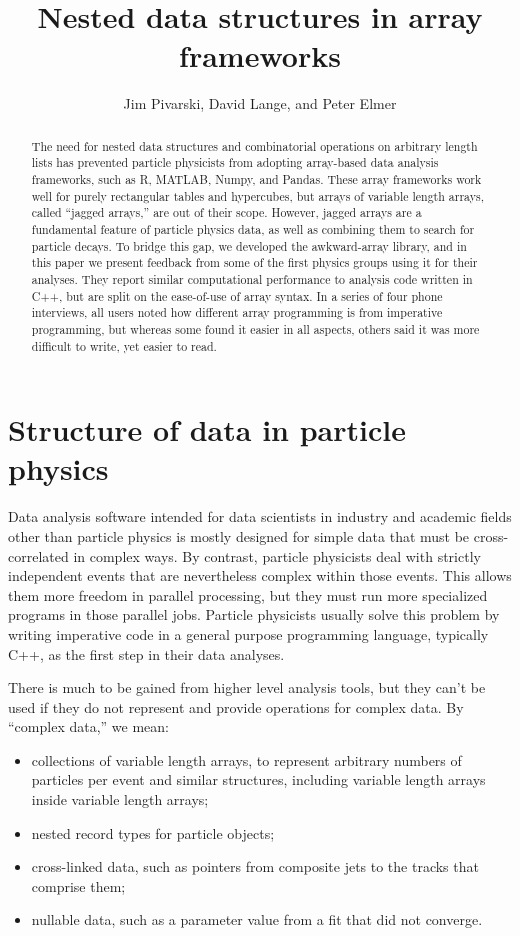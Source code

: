\documentclass[a4paper]{jpconf}
\begin{document}
\title{Nested data structures in array frameworks}

\author{Jim Pivarski, David Lange, and Peter Elmer}

\address{Princeton University}


\begin{abstract}
The need for nested data structures and combinatorial operations on arbitrary length lists has prevented particle physicists from adopting array-based data analysis frameworks, such as R, MATLAB, Numpy, and Pandas. These array frameworks work well for purely rectangular tables and hypercubes, but arrays of variable length arrays, called ``jagged arrays,'' are out of their scope. However, jagged arrays are a fundamental feature of particle physics data, as well as combining them to search for particle decays. To bridge this gap, we developed the awkward-array library, and in this paper we present feedback from some of the first physics groups using it for their analyses. They report similar computational performance to analysis code written in C++, but are split on the ease-of-use of array syntax. In a series of four phone interviews, all users noted how different array programming is from imperative programming, but whereas some found it easier in all aspects, others said it was more difficult to write, yet easier to read.
\end{abstract}

\section{Structure of data in particle physics}

Data analysis software intended for data scientists in industry and academic fields other than particle physics is mostly designed for simple data that must be cross-correlated in complex ways. By contrast, particle physicists deal with strictly independent events that are nevertheless complex within those events. This allows them more freedom in parallel processing, but they must run more specialized programs in those parallel jobs. Particle physicists usually solve this problem by writing imperative code in a general purpose programming language, typically C++, as the first step in their data analyses.

There is much to be gained from higher level analysis tools, but they can't be used if they do not represent and provide operations for complex data. By ``complex data,'' we mean:
\begin{itemize}
\item collections of variable length arrays, to represent arbitrary numbers of particles per event and similar structures, including variable length arrays inside variable length arrays;
\item nested record types for particle objects;
\item cross-linked data, such as pointers from composite jets to the tracks that comprise them;
\item nullable data, such as a parameter value from a fit that did not converge.
\end{itemize}
\end{document}
